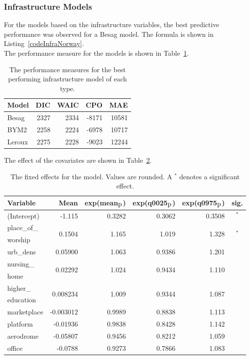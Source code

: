 \subsubsection{Infrastructure Models}
For the models based on the infrastructure variables, the best predictive performance was observed for a Besag model. The formula is shown in Listing~\ref{codeInfraNorway}. \\
The performance measure for the models is shown in Table~\ref{infraNorway}.
\begin{table}[H] 
\caption{The performance measures for the best performing infrastructure model of each type. \label{infraNorway}}
\begin{tabular}{l r r r r}
\toprule
\textbf{Model}	& \textbf{DIC}	& \textbf{WAIC} & \textbf{CPO} & \textbf{MAE} \\
\midrule
Besag  & 2327 & 2334 & -8171 & 10581 \\
BYM2 & 2258 & 2224 & -6978 & 10717\\
Leroux &  2275 & 2228 & -9023 & 12244\\
\bottomrule
\end{tabular}
\end{table}
The effect of the covariates are shown in Table~\ref{fixedInfraNorway_spatial}.
\begin{table}[H]
\caption{The fixed effects for the model. Values are rounded. A $^*$ denotes a significant effect. \label{fixedInfraNorway_spatial}}
\begin{tabular}{l r r r r c}
\toprule
\textbf{Variable}	& \textbf{Mean}	& \textbf{exp(mean$_{\hbox{p}}$)} & \textbf{exp(q0025$_{\hbox{p}}$)} & \textbf{exp(q0975$_{\hbox{p}}$)} & \textbf{sig.}\\
\midrule
(Intercept) & -1.115 & 0.3282 & 0.3062 & 0.3508 & $^*$ \\
place\_of\_ & \multirow{2}{*}{0.1504} & \multirow{2}{*}{1.165} & \multirow{2}{*}{1.019} & \multirow{2}{*}{1.328} & \multirow{2}{*}{$^*$} \\
worship\\
urb\_dens & 0.05900 & 1.063 & 0.9386 & 1.201 &  \\
nursing\_ & \multirow{2}{*}{0.02292} & \multirow{2}{*}{1.024} & \multirow{2}{*}{0.9434} & \multirow{2}{*}{1.110}\\
home\\
higher\_ & \multirow{2}{*}{0.008234} & \multirow{2}{*}{1.009} & \multirow{2}{*}{0.9344} & \multirow{2}{*}{1.087} \\
education\\
marketplace & -0.003012 & 0.9989 & 0.8838 & 1.113 \\
platform & -0.01936 & 0.9838 & 0.8428 & 1.142 \\
aerodrome & -0.05807 & 0.9456 & 0.8212 & 1.059  \\
office & -0.0788 & 0.9273 & 0.7866 & 1.083  \\
\bottomrule
\end{tabular}
\end{table}
